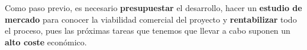 Como paso previo, es necesario \textbf{presupuestar} el desarrollo, hacer un \textbf{estudio de mercado} para conocer la viabilidad comercial del proyecto y \textbf{rentabilizar} todo el proceso, pues las próximas tareas que tenemos que llevar a cabo suponen un \textbf{alto coste} económico.

\newpage
\clearpage{\pagestyle{empty}\cleardoublepage}
